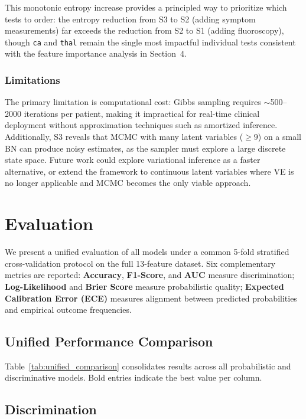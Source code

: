 \documentclass{article}
\begin{document}
This monotonic entropy increase provides a principled way to prioritize which tests to order: the entropy reduction from S3 to S2 (adding symptom measurements) far exceeds the reduction from S2 to S1 (adding fluoroscopy), though \texttt{ca} and \texttt{thal} remain the single most impactful individual tests consistent with the feature importance analysis in Section~4.

\subsubsection{Limitations}

The primary limitation is computational cost: Gibbs sampling requires $\sim$500--2000 iterations per patient, making it impractical for real-time clinical deployment without approximation techniques such as amortized inference. Additionally, S3 reveals that MCMC with many latent variables ($\geq 9$) on a small BN can produce noisy estimates, as the sampler must explore a large discrete state space. Future work could explore variational inference as a faster alternative, or extend the framework to continuous latent variables where VE is no longer applicable and MCMC becomes the only viable approach.






\section{Evaluation}

We present a unified evaluation of all models under a common 5-fold stratified cross-validation protocol on the full 13-feature dataset. Six complementary metrics are reported: \textbf{Accuracy}, \textbf{F1-Score}, and \textbf{AUC} measure discrimination; \textbf{Log-Likelihood} and \textbf{Brier Score} measure probabilistic quality; \textbf{Expected Calibration Error (ECE)} measures alignment between predicted probabilities and empirical outcome frequencies.

\subsection{Unified Performance Comparison}

Table~\ref{tab:unified_comparison} consolidates results across all probabilistic and discriminative models. Bold entries indicate the best value per column.

\subsection{Discrimination}
\end{document}

